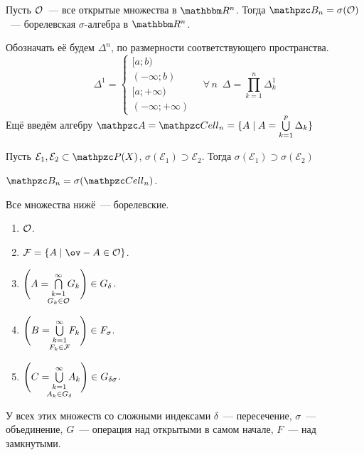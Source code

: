 \documentclass[12pt, timbord]{longnotes}
\begin{document}
\begin{defn}\label{defn:meas::setsys::borel}
  Пусть $\mathcal O$~--- все открытые множества в $\R^n$. Тогда $\mathpzc B_n = \sigma(\open)
  $~--- борелевская $\sigma$-алгебра в $\R^n$.
\end{defn}

\begin{defn}[Ячейка в $\R^n$ ]\label{defn:meas::setsys::cell}
  Обозначать её будем $\Delta^n$, по размерности соответствующего пространства.
  \[
    \Delta^1 = \begin{cases}
      [a;b) \\
      (-\infty;b) \\
      [a;+\infty) \\
      (-\infty;+\infty)
    \end{cases} \quad
    \forall\, n \;\: \Delta = \prod_{k=1}^n \Delta^1 _k 
  \]
  Ещё введём алгебру $\alg = \Cell_n = \{ A \mid A = \bigcup_{k=1}^p \Delta_k\}$
\end{defn} 

\begin{lem}\label{lem:meas::setsys::algsubset}
  Пусть $\mathcal E_1, \mathcal E_2 \subset \pset(X)$, $\sigma(\mathcal E_1) \supset \mathcal E_2$.
  Тогда $\sigma(\mathcal E_1) \supset \sigma(\mathcal E_2)$
\end{lem}
\begin{thrm}\label{thrm:meas::setsys::borelcell}
  $\borel_n = \sigma(\Cell_n)$.
\end{thrm}

\begin{exmp}\label{exmp:meas::setsys::borel}
  Все множества нижё~--- борелевские.
  \begin{enumerate}
    \item $\mathcal O $.
    \item $\closed =\{A \mid \ov-{A} \in \open \}$.
    \item $\Biggl(A 
      = \bigcap_{\substack{{k=1}\\[0.12em]\mathclap{ G_k \in \open}}}^\infty G_k \Biggr)\in G_\delta$.
    \item $\Biggl(B 
      = \bigcup_{\substack{{k=1}\\[0.12em]\mathclap{ F_k \in \closed}}}^\infty F_k \Biggr)\in
      F_\sigma$.
    \item $\Biggl(C 
      = \bigcup_{\substack{{k=1}\\[0.12em]\mathclap{ A_k \in G_{\delta}}}}^\infty A_k \Biggr)
      \in G_{\delta\sigma}$.
  \end{enumerate}
  У всех этих множеств со сложными индексами $\delta$~--- пересечение, $\sigma$~--- объединение,
  $G$~--- операция над открытыми в самом начале, $F$~--- над замкнутыми.
\end{exmp}
\end{document}
